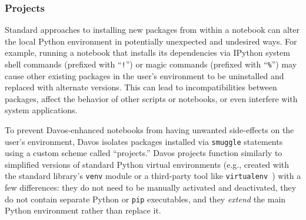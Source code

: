 \documentclass[preprint,12pt,a4paper]{elsarticle}
\begin{document}
\subsubsection{Projects}\label{subsec:projects}

Standard approaches to installing new packages from within a notebook can alter the local Python environment in potentially unexpected and undesired ways. For example, running a notebook that installs its dependencies via IPython system shell commands (prefixed with ``\texttt{!}'') or magic commands (prefixed with ``\texttt{\%}'') may cause other existing packages in the user's environment to be uninstalled and replaced with alternate versions. This can lead to incompatibilities between packages, affect the behavior of other scripts or notebooks, or even interfere with system applications. 

To prevent Davos-enhanced notebooks from having unwanted side-effects on the user's environment, Davos isolates packages installed via \texttt{smuggle} statements using a custom scheme called ``projects.'' Davos projects function similarly to simplified versions of standard Python virtual environments (e.g., created with the standard library's \texttt{venv} module or a third-party tool like \texttt{virtualenv}~\cite{BickEtal07}) with a few differences: they do not need to be manually activated and deactivated, they do not contain separate Python or \texttt{pip} executables, and they \textit{extend} the main Python environment rather than replace it. 




%
%
%
%
%
%
%
\end{document}
